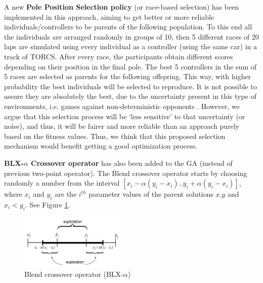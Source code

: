 \documentclass[conference]{IEEEtran}
\begin{document}
A new \textbf{Pole Position Selection policy} (or race-based selection) has been implemented in this approach, aiming to get better or more reliable individuals/controllers to be parents of the following population. To this end all the individuals are arranged randomly in groups of 10, then 5 different races of 20 laps are simulated using every individual as a controller (using the same car) in a track of TORCS. After every race, the participants obtain different scores depending on their position in the final pole. The best 5 controllers in the sum of 5 races are selected as parents for the following offspring.
This way, with higher probability the best individuals will be selected to reproduce. It is not possible to assure they are absolutely the best, due to the uncertainty present in this type of environments, i.e. games against non-deterministic opponents \cite{merelo2016statistical}. However, we argue that this selection process will be `less sensitive' to that uncertainty (or noise), and thus, it will be fairer and more reliable than an approach purely based on the fitness values. Thus, we think that this proposed selection mechanism would benefit getting a good optimization process.


\textbf{BLX-$\alpha$ Crossover operator} \cite{blx2008} has also been added to the GA (instead of previous two-point operator). 
The Blend crossover operator starts by choosing randomly a number from the interval $[x_i-\alpha(y_i-x_i).. y_i+\alpha(y_i-x_i)]$, where $x_i$ and $y_i$ are the
$i^{th}$ parameter values of the parent solutions $x$,$y$ and $x_i < y_i$. See Figure \ref{fig:blxalpha}.

\begin{figure}[!ht]	
	\begin{center}
		\includegraphics[width=5cm]{fig/blxalpha.jpg}
		\caption{Blend crossover operator (BLX-$\alpha$)}
		\label{fig:blxalpha}	
	\end{center}	
\end{figure}
\end{document}
